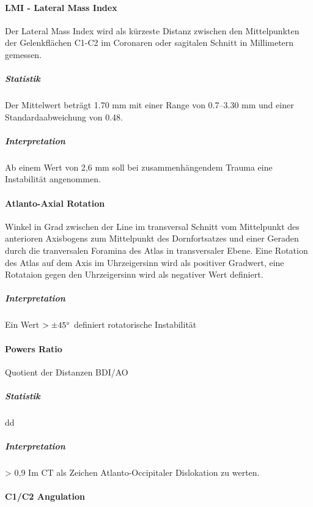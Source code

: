 \documentclass{report}
\begin{document}
\paragraph{LMI - Lateral Mass Index}

Der Lateral Mass Index wird als kürzeste Distanz zwischen den Mittelpunkten der Gelenkflächen C1-C2 im Coronaren oder sagitalen Schnitt in Millimetern gemessen. 
\subparagraph{Statistik}
Der Mittelwert beträgt 1.70 mm mit einer Range von 0.7–3.30 mm und einer Standardaabweichung von 0.48.
\subparagraph{Interpretation}
 Ab einem Wert von 2,6 mm soll bei zusammenhängendem Trauma eine Instabilität angenommen.

 


\paragraph{Atlanto-Axial Rotation} %
\label{par:c1_c2_rotation}
Winkel in Grad zwischen der Line im transversal Schnitt vom Mittelpunkt des anterioren Axisbogens zum Mittelpunkt des Dornfortsatzes und einer Geraden durch die tranversalen Foramina des Atlas in transversaler Ebene.
Eine Rotation des Atlas auf dem Axis im Uhrzeigersinn wird als positiver Gradwert, eine Rotataion gegen den Uhrzeigersinn wird als negativer Wert definiert.

\subparagraph{Interpretation}
 Ein Wert  $>\pm 45 \degree$ definiert rotatorische Instabilität
\paragraph{Powers Ratio} %
\label{par:powers_ratio}
Quotient der Distanzen BDI/AO

\subparagraph{Statistik}
\begin{tabular}
dd
\end{tabular}
\subparagraph{Interpretation} %
\label{subp:}
> 0,9 Im CT als Zeichen Atlanto-Occipitaler Dislokation zu werten.


\paragraph{C1/C2 Angulation} %
\label{par:c1_c2_angulation}

\paragraph{}
\end{document}
